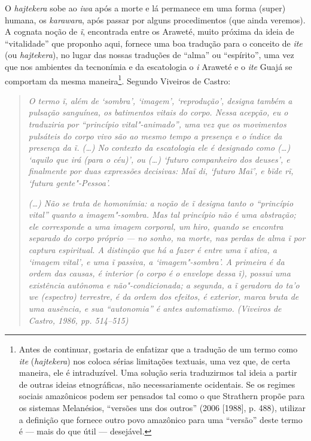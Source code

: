 O \emph{hajtekera} sobe ao \emph{iwa} após a morte e lá permanece em uma
forma (super) humana, os \emph{karawara}, após passar por alguns
procedimentos (que ainda veremos). A cognata noção de \emph{ĩ},
encontrada entre os Araweté, muito próxima da ideia de ``vitalidade'' que
proponho aqui, fornece uma boa tradução para o conceito de \emph{ite}
(ou \emph{hajtekera}), no lugar das nossas traduções de ``alma'' ou
``espírito'', uma vez que nos ambientes da tecnonímia e da escatologia o
\emph{i} Araweté e o \emph{ite} Guajá se comportam da mesma
maneira\footnote{Antes de continuar, gostaria de enfatizar que a
  tradução de um termo como \emph{ite} (\emph{hajtekera}) nos coloca
  sérias limitações textuais, uma vez que, de certa maneira, ele é
  intraduzível. Uma solução seria traduzirmos tal ideia a partir de
  outras ideias etnográficas, não necessariamente ocidentais. Se os
  regimes sociais amazônicos podem ser pensados tal como o que Strathern
  propõe para os sistemas Melanésios, ``versões uns dos outros'' (2006 [1988], p. 488), utilizar a definição que fornece outro povo amazônico para uma ``versão'' deste termo é --- mais do que útil --- desejável.}. Segundo Viveiros de Castro:

\begin{quote}
\emph{O termo \emph{ĩ}, além de `sombra', `imagem', `reprodução', designa
também a pulsação sanguínea, os batimentos vitais do corpo. Nessa
acepção, eu o traduziria por ``princípio vital"-animado'', uma vez que os
movimentos pulsáteis do corpo vivo são ao mesmo tempo a presença e o
índice da presença da \emph{ĩ}. (\ldots{}) No contexto da escatologia ele é
designado como (\ldots{}) `aquilo que irá (para o céu)', ou (\ldots{}) `futuro
companheiro dos deuses', e finalmente por duas expressões decisivas:
\emph{Maï di}, `futuro Maï', e \emph{bïde rĩ}, `futura gente"-Pessoa'.}

\noindent\emph{(\ldots{}) Não se trata de homonímia: a noção de \emph{ĩ} designa tanto o
``princípio vital'' quanto a imagem"-sombra. Mas tal princípio não é uma
abstração; ele corresponde a uma imagem corporal, um \emph{hiro}, quando
se encontra separado do corpo próprio --- no sonho, na morte, nas perdas
de alma \emph{ĩ} por captura espiritual. A distinção que há a fazer é
entre uma \emph{ĩ} {ativa}, a `imagem vital', e uma \emph{ĩ} {passiva},
a `imagem"-sombra'. A primeira é da ordem das causas, é {interior} (o
corpo é o envelope dessa \emph{ĩ}), possui uma existência autônoma e
não"-condicionada; a segunda, a \emph{ĩ} geradora do \emph{ta'o we}
(espectro) terrestre, é da ordem dos efeitos, é exterior, marca bruta de
uma ausência, e sua ``autonomia'' é antes automatismo. (Viveiros de
Castro, 1986, pp. 514--515)}
\end{quote}

